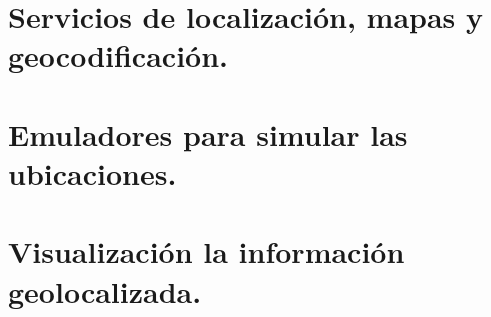 \documentclass[a4paper,12pt,spanish]{sphinxmanual}
\begin{document}
\section{Servicios de localización, mapas y geocodificación.}
\label{index:servicios-de-localizacion-mapas-y-geocodificacion}

\section{Emuladores para simular las ubicaciones.}
\label{index:emuladores-para-simular-las-ubicaciones}

\section{Visualización la información geolocalizada.}
\label{index:visualizacion-la-informacion-geolocalizada}


\renewcommand{\indexname}{Índice}
\printindex
\end{document}
